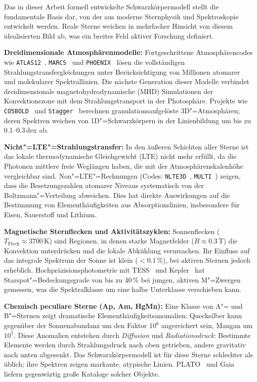 ﻿\documentclass[a4paper,12pt]{article}
\theoremstyle{definition}
\begin{document}
Das in dieser Arbeit formell entwickelte Schwarzkörpermodell stellt die
fundamentale Basis dar, von der aus moderne Sternphysik und Spektroskopie
entwickelt werden. Reale Sterne weichen in mehrfacher Hinsicht von diesem
idealisierten Bild ab, was ein breites Feld aktiver Forschung definiert.

\textbf{Dreidimensionale Atmosphärenmodelle:}
Fortgeschrittene Atmosphärencodes wie \texttt{ATLAS12}~\cite{kurucz1993},
\texttt{MARCS}~\cite{gustafsson2008} und \texttt{PHOENIX}~\cite{hauschildt1999}
lösen die vollständigen Strahlungstransfergleichungen unter Berücksichtigung
von Millionen atomarer und molekularer Spektrallinien. Die nächste Generation
dieser Modelle verbindet dreidimensionale magnetohydrodynamische (MHD) Simulationen
der Konvektionszone mit dem Strahlungstransport in der Photosphäre.
Projekte wie \texttt{CO5BOLD}~\cite{freytag2012} und \texttt{Stagger}~\cite{magic2013}
berechnen granulationsaufgelöste 3D"=Atmosphären; deren Spektren weichen von
1D"=Schwarzkörpern in der Linienbildung um bis zu 0.1--0.3\,dex ab.

\textbf{Nicht"=LTE"=Strahlungstransfer:}
In den äußeren Schichten aller Sterne ist das lokale thermodynamische
Gleichgewicht (LTE) nicht mehr erfüllt, da die Photonen mittlere freie
Weglängen haben, die mit der Atmosphärenskalenhöhe vergleichbar sind.
Non"=LTE"=Rechnungen (Codes: \texttt{NLTE3D}~\cite{bergemann2012},
\texttt{MULTI}~\cite{carlsson1986}) zeigen, dass die Besetzungszahlen
atomarer Niveaus systematisch von der Boltzmann"=Verteilung abweichen.
Dies hat direkte Auswirkungen auf die Bestimmung von Elementhäufigkeiten
aus Absorptionslinien, insbesondere für Eisen, Sauerstoff und Lithium.

\textbf{Magnetische Sternflecken und Aktivitätszyklen:}
Sonnenflecken ($T_{\text{Fleck}} \approx 3700\,\text{K}$) sind Regionen,
in denen starke Magnetfelder ($B \approx 0.3\,\text{T}$) die Konvektion
unterdrücken und die lokale Abkühlung verursachen. Ihr Einfluss auf das
integrale Spektrum der Sonne ist klein ($< 0.1\,\%$), bei aktiven Sternen
jedoch erheblich. Hochpräzisionsphotometrie mit TESS~\cite{ricker2015}
und Kepler~\cite{borucki2010} hat Starspot"=Bedeckungsgrade von bis zu
40\,\% bei jungen, aktiven M"=Zwergen gemessen, was die Spektralklasse
um eine halbe Unterklasse verschieben kann.

\textbf{Chemisch peculiare Sterne (Ap, Am, HgMn):}
Eine Klasse von A"= und B"=Sternen zeigt dramatische
Elementhäufigkeitsanomalien: Quecksilber kann gegenüber der Sonnenabundanz
um den Faktor $10^6$ angereichert sein, Mangan um $10^5$.
Diese Anomalien entstehen durch \emph{Diffusion} und \emph{Radiationsdruck}:
Bestimmte Elemente werden durch Strahlungsdruck nach oben getrieben,
andere gravitativ nach unten abgesenkt. Das Schwarzkörpermodell ist
für diese Sterne schlechter als üblich; ihre Spektren zeigen markante,
atypische Linien. PLATO~\cite{rauer2014} und Gaia~\cite{prusti2016}
liefern gegenwärtig große Kataloge solcher Objekte.
\end{document}
